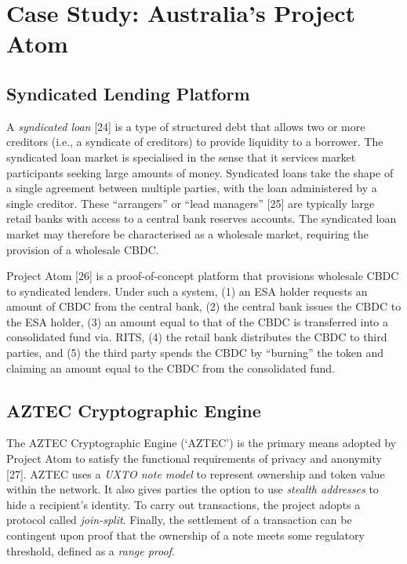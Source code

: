 \section{Case Study: Australia's Project Atom}

\subsection{Syndicated Lending Platform}

A \textit{syndicated loan} [24] is a type of structured debt that allows two or more creditors (i.e., a syndicate of creditors) to provide liquidity to a borrower. The syndicated loan market is specialised in the sense that it services market participants seeking large amounts of money. Syndicated loans take the shape of a single agreement between multiple parties, with the loan administered by a single creditor. These ``arrangers'' or ``lead managers'' [25] are typically large retail banks with access to a central bank reserves accounts. The syndicated loan market may therefore be characterised as a wholesale market, requiring the provision of a wholesale CBDC.

Project Atom [26] is a proof-of-concept platform that provisions wholesale CBDC to syndicated lenders. Under such a system, (1) an ESA holder requests an amount of CBDC from the central bank, (2) the central bank issues the CBDC to the ESA holder, (3) an amount equal to that of the CBDC is transferred into a consolidated fund via. RITS, (4) the retail bank distributes the CBDC to third parties, and (5) the third party spends the CBDC by ``burning'' the token and claiming an amount equal to the CBDC from the consolidated fund.

\subsection{AZTEC Cryptographic Engine}

The AZTEC Cryptographic Engine (`AZTEC') is the primary means adopted by Project Atom to satisfy the functional requirements of privacy and anonymity [27]. AZTEC uses a \textit{UXTO note model} to represent ownership and token value within the network. It also gives parties the option to use \textit{stealth addresses} to hide a recipient's identity. To carry out transactions, the project adopts a protocol called \textit{join-split}. Finally, the settlement of a transaction can be contingent upon proof that the ownership of a note meets some regulatory threshold, defined as a \textit{range proof}.

